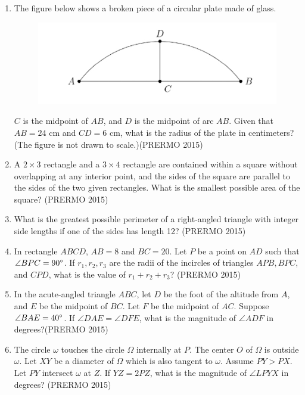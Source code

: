 \begin{enumerate}
\item The figure below shows a broken piece of a circular plate made of glass.
    
	  
		\begin{figure}[h!]
    \centering
	    \includegraphics[width=\columnwidth]{figs/permo.jpg}
    \end{figure}



    $ C $ is the midpoint of $ AB $, and $ D $ is the midpoint of arc $ AB $. Given that $ AB = 24 $ cm and $ CD = 6 $ cm, what is the radius of the plate in centimeters? (The figure is not drawn to scale.)\hfill(PRERMO 2015)

    \item A $ 2 \times 3 $ rectangle and a $ 3 \times 4 $ rectangle are contained within a square without overlapping at any interior point, and the sides of the square are parallel to the sides of the two given rectangles. What is the smallest possible area of the square? \hfill(PRERMO 2015)

    \item What is the greatest possible perimeter of a right-angled triangle with integer side lengths if one of the sides has length 12? \hfill(PRERMO 2015)

    \item In rectangle $ ABCD $, $ AB = 8 $ and $ BC = 20 $. Let $ P $ be a point on $ AD $ such that $ \angle BPC = 90\degree $. If $ r_1, r_2, r_3 $ are the radii of the incircles of triangles $ APB, BPC $, and $ CPD $, what is the value of $ r_1 + r_2 + r_3 $? \hfill(PRERMO 2015)


\item In the acute-angled triangle $ABC$, let $D$ be the foot of the altitude from $A$, and $E$ be the midpoint of $BC$. Let $F$ be the midpoint of $AC$. Suppose $ \angle BAE = 40\degree $. If $ \angle DAE = \angle DFE $, what is the magnitude of $ \angle ADF $ in degrees?\hfill(PRERMO 2015)

\item The circle $ \omega $ touches the circle $ \Omega $ internally at $ P $. The center $ O $ of $ \Omega $ is outside $ \omega $. Let $XY$ be a diameter of $ \Omega $ which is also tangent to $ \omega $. Assume $ PY > PX $. Let $ PY $ intersect $ \omega $ at $ Z $. If $ YZ = 2PZ $, what is the magnitude of $ \angle LPYX $ in degrees? \hfill(PRERMO 2015)
\end{enumerate}
